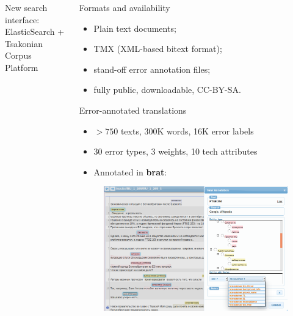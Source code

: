 \documentclass{beamer}
\begin{document}
\begin{frame}[fragile]
\begin{columns}[T]
\begin{column}{.55\textwidth}
\begin{block}{New search interface: \\ElasticSearch + Tsakonian Corpus Platform}
\end{block}
\end{column}

\begin{column}{.4\textwidth}

\begin{block}{Formats and availability}
\begin{itemize}
				\item Plain text documents;
				\item \alert{TMX} (XML-based bitext format);
				\item stand-off error annotation files;
				\item fully public, downloadable, CC-BY-SA.
\end{itemize}
\end{block}

\begin{block}{Error-annotated translations}
			\begin{itemize}
				\item $ > 750$ texts, 300K words, 16K error labels
				\item 30 error types, 3 weights, 10 tech attributes
				\item Annotated in \textbf{brat}:
			\end{itemize}

\begin{figure}
    \includegraphics[scale=0.5,keepaspectratio]{images/brat.png}
\end{figure}


\end{block}
\end{column}
\end{columns}
\end{frame}
\end{document}
